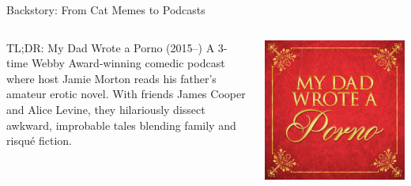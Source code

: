 \begin{frame}{Backstory: From Cat Memes to Podcasts}
\begin{columns}
    \begin{column}{0.8\textwidth}
        \begin{exampleblock}{TL;DR: My Dad Wrote a Porno (2015--)}
            A 3-time Webby Award-winning comedic podcast where host Jamie Morton reads his father's amateur erotic novel. With friends James Cooper and Alice Levine, they hilariously dissect awkward, improbable tales blending family and risqué fiction.
        \end{exampleblock}
    \end{column}
    \begin{column}{0.2\textwidth}
        \includegraphics[width=\textwidth]{../figures/my-dad-wrote-a-porno}
    \end{column}
\end{columns}


\end{frame}

